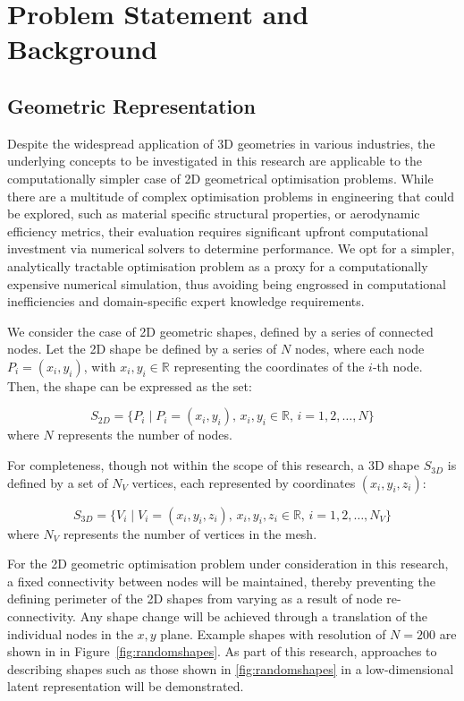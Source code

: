 \documentclass{article}
\begin{document}
\newpage

\section{Problem Statement and Background}

\subsection{Geometric Representation}\label{Geometry}

Despite the widespread application of 3D geometries in various industries, the underlying concepts to be investigated in this research are applicable to the computationally simpler case of 2D geometrical optimisation problems.  While there are a multitude of complex optimisation problems in engineering that could be explored, such as material specific structural properties, or aerodynamic efficiency metrics, their evaluation requires significant upfront computational investment via numerical solvers to determine performance. We opt for a simpler, analytically tractable optimisation problem as a proxy for a computationally expensive numerical simulation, thus avoiding being engrossed in computational inefficiencies and domain-specific expert knowledge requirements.

We consider the case of 2D geometric shapes, defined by a series of connected nodes.
Let the 2D shape be defined by a series of \(N\) nodes, where each node \(P_i = (x_i, y_i)\), with \(x_i, y_i \in \mathbb{R}\) representing the coordinates of the \(i\)-th node. Then, the shape can be expressed as the set:

\[
S_{2D} = \{ P_i \mid P_i = (x_i, y_i), \, x_i, y_i \in \mathbb{R}, \, i = 1, 2, \dots, N \}
\]
where \(N\) represents the number of nodes.

For completeness, though not within the scope of this research, a 3D shape \(S_{3D}\) is defined by a set of \(N_V\) vertices, each represented by coordinates \((x_i, y_i, z_i)\):

\[
S_{3D} = \{ V_i \mid V_i = (x_i, y_i, z_i), \, x_i, y_i, z_i \in \mathbb{R}, \, i = 1, 2, \dots, N_V \}
\]
where \(N_V\) represents the number of vertices in the mesh.

For the 2D geometric optimisation problem under consideration in this research, a fixed connectivity between nodes will be maintained, thereby preventing the defining perimeter of the 2D shapes from varying as a result of node re-connectivity. Any shape change will be achieved through a translation of the individual nodes in the $x,y$ plane. Example shapes with resolution of $N=200$ are shown in in Figure~\ref{fig:randomshapes}. As part of this research, approaches to describing shapes such as those shown in \ref{fig:randomshapes} in a low-dimensional latent representation will be demonstrated.
\end{document}
